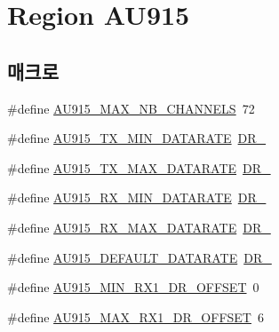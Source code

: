 \hypertarget{group___r_e_g_i_o_n_a_u915}{}\section{Region A\+U915}
\label{group___r_e_g_i_o_n_a_u915}
\subsection*{매크로}
\begin{DoxyCompactItemize}
\item 
\#define \mbox{\hyperlink{group___r_e_g_i_o_n_a_u915_ga2b76c47d2463a72cc6c69a6384a6de11}{A\+U915\+\_\+\+M\+A\+X\+\_\+\+N\+B\+\_\+\+C\+H\+A\+N\+N\+E\+LS}}~72
\item 
\#define \mbox{\hyperlink{group___r_e_g_i_o_n_a_u915_ga3a7bb744191d2b9daaf6637d36d78422}{A\+U915\+\_\+\+T\+X\+\_\+\+M\+I\+N\+\_\+\+D\+A\+T\+A\+R\+A\+TE}}~\mbox{\hyperlink{group___r_e_g_i_o_n_ga6c4ef966b4f3d5eb7597b087f2b97095}{D\+R\+\_}}
\item 
\#define \mbox{\hyperlink{group___r_e_g_i_o_n_a_u915_gada67d69eba43730ad99c2a9f00308257}{A\+U915\+\_\+\+T\+X\+\_\+\+M\+A\+X\+\_\+\+D\+A\+T\+A\+R\+A\+TE}}~\mbox{\hyperlink{group___r_e_g_i_o_n_ga8e2b4c15b7dbb8bda5ed635ca1d262be}{D\+R\+\_}}
\item 
\#define \mbox{\hyperlink{group___r_e_g_i_o_n_a_u915_ga6c3e760e2bc555e4d608ff12d14f6652}{A\+U915\+\_\+\+R\+X\+\_\+\+M\+I\+N\+\_\+\+D\+A\+T\+A\+R\+A\+TE}}~\mbox{\hyperlink{group___r_e_g_i_o_n_ga44cc96ba80ae464cd9330b784d329c16}{D\+R\+\_}}
\item 
\#define \mbox{\hyperlink{group___r_e_g_i_o_n_a_u915_ga5ce832bce671573a6b6bb4a8358b250e}{A\+U915\+\_\+\+R\+X\+\_\+\+M\+A\+X\+\_\+\+D\+A\+T\+A\+R\+A\+TE}}~\mbox{\hyperlink{group___r_e_g_i_o_n_ga226f47470cc69a6fe831f7c92709bc1f}{D\+R\+\_}}
\item 
\#define \mbox{\hyperlink{group___r_e_g_i_o_n_a_u915_gaf13e696fe1ca41f523d0a52b0878c278}{A\+U915\+\_\+\+D\+E\+F\+A\+U\+L\+T\+\_\+\+D\+A\+T\+A\+R\+A\+TE}}~\mbox{\hyperlink{group___r_e_g_i_o_n_ga6c4ef966b4f3d5eb7597b087f2b97095}{D\+R\+\_}}
\item 
\#define \mbox{\hyperlink{group___r_e_g_i_o_n_a_u915_ga7de844f699bceb5022c05f4ed53d63e9}{A\+U915\+\_\+\+M\+I\+N\+\_\+\+R\+X1\+\_\+\+D\+R\+\_\+\+O\+F\+F\+S\+ET}}~0
\item 
\#define \mbox{\hyperlink{group___r_e_g_i_o_n_a_u915_ga6787225088f0c4c8ce35106f5a986f4c}{A\+U915\+\_\+\+M\+A\+X\+\_\+\+R\+X1\+\_\+\+D\+R\+\_\+\+O\+F\+F\+S\+ET}}~6

\end{DoxyCompactItemize}
